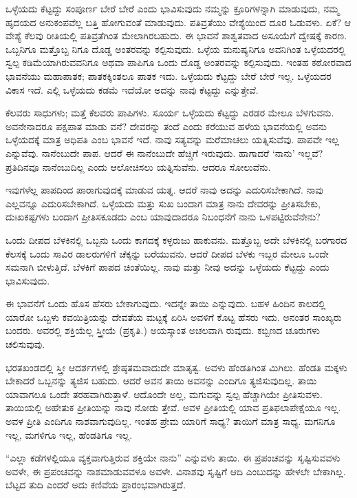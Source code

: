 ಒಳ್ಳೆಯದು ಕೆಟ್ಟದ್ದು ಸಂಪೂರ್ಣ ಬೇರೆ ಬೇರೆ ಎಂದು ಭಾವಿಸುವುದು ನಮ್ಮನ್ನು ಕ್ರೂರಿಗಳನ್ನಾಗಿ ಮಾಡುವುದು, ನಮ್ಮ ಹೃದಯದ ಅನುಕಂಪವೆಲ್ಲ ಬತ್ತಿ ಹೋಗುವಂತೆ ಮಾಡುವುದು. ಪತಿವ್ರತೆಯು ವೇಶ್ಯೆಯಿಂದ ದೂರ ಓಡುವಳು. ಏಕೆ? ಆ ವೇಶ್ಯೆ ಕೆಲವು ರೀತಿಯಲ್ಲಿ ಪತಿವ್ರತೆಗಿಂತ ಮೇಲಾಗಿರಬಹುದು. ಈ ಭಾವನೆ ಶಾಶ್ವತವಾದ ಅಸೂಯೆಗೆ ದ್ವೇಷಕ್ಕೆ ಕಾರಣ. ಒಬ್ಬನಿಗೂ ಮತ್ತೊಬ್ಬ ನಿಗೂ ದೊಡ್ಡ ಅಂತರವನ್ನು ಕಲ್ಪಿಸುವುದು. ಒಳ್ಳೆಯ ಮನುಷ್ಯನಿಗೂ ಅವನಿಗಿಂತ ಒಳ್ಳೆಯದರಲ್ಲಿ ಸ್ವಲ್ಪ ಕಡಿಮೆಯಾಗಿರುವವನಿಗೂ ಅಥವಾ ಪಾಪಿಗೂ ಒಂದು ದೊಡ್ಡ ಅಂತರವನ್ನು ಕಲ್ಪಿಸುವುದು. ಇಂತಹ ಕಠೋರವಾದ ಭಾವನೆಯು ಮಹಾಪಾತಕ; ಪಾತಕಕ್ಕಿಂತಲೂ ಪಾತಕ ಇದು. ಒಳ್ಳೆಯದು ಕೆಟ್ಟದ್ದು ಬೇರೆ ಬೇರೆ ಇಲ್ಲ. ಒಳ್ಳೆಯದರ ವಿಕಾಸ ಇದೆ. ಎಲ್ಲಿ ಒಳ್ಳೆಯದು ಕಡಮೆ ಇದೆಯೋ ಅದನ್ನು ನಾವು ಕೆಟ್ಟದ್ದು ಎನ್ನುತ್ತೇವೆ.

ಕೆಲವರು ಸಾಧುಗಳು; ಮತ್ತೆ ಕೆಲವರು ಪಾಪಿಗಳು. ಸೂರ್ಯ ಒಳ್ಳೆಯದು ಕೆಟ್ಟದ್ದು ಎರಡರ ಮೇಲೂ ಬೆಳಗುವನು. ಅವನೇನಾದರೂ ಪಕ್ಷಪಾತ ಮಾಡು ವನೆ? ದೇವರನ್ನು ತಂದೆ ಎಂದು ಕರೆಯುವ ಹಳೆಯ ಭಾವನೆಯಲ್ಲಿ ಅವನು ಒಳ್ಳೆಯದಕ್ಕೆ ಮಾತ್ರ ಅಧಿಪತಿ ಎಂಬ ಭಾವನೆ ಇದೆ. ನಾವು ಸತ್ಯವನ್ನು ಮರೆಮಾಚಲು ಯತ್ನಿಸುವೆವು. ಪಾಪವೇ ಇಲ್ಲ ಎನ್ನುವೆವು. ನಾನೆಂಬುದೇ ಪಾಪ. ಆದರೆ ಈ ನಾನೆಂಬುದೇ ಹೆಚ್ಚಿಗೆ ಇರುವುದು. ಹಾಗಾದರೆ ‘ನಾನು’ ಇಲ್ಲವೆ? ಪ್ರತಿದಿನವೂ ನಾನೆಂಬುದಿಲ್ಲ ಎಂದು ಆಲೋಚಿಸಲು ಯತ್ನಿಸುವೆನು. ಆದರೂ ಸೋಲುವೆನು.

ಇವುಗಳೆಲ್ಲ ಪಾಪದಿಂದ ಪಾರಾಗುವುದಕ್ಕೆ ಮಾಡುವ ಯತ್ನ. ಆದರೆ ನಾವು ಅದನ್ನು ಎದುರಿಸಬೇಕಾಗಿದೆ. ನಾವು ಎಲ್ಲವನ್ನೂ ಎದುರಿಸಬೇಕಾಗಿದೆ. ಒಳ್ಳೆಯದು ಮತ್ತು ಸುಖ ಬಂದಾಗ ಮಾತ್ರ ನಾನು ದೇವರನ್ನು ಪ್ರೀತಿಸಬೇಕು, ದುಃಖಕಷ್ಟಗಳು ಬಂದಾಗ ಪ್ರೀತಿಸಕೂಡದು ಎಂಬ ಯಾವುದಾದರೂ ನಿಬಂಧನೆಗೆ ನಾನು ಒಳಪಟ್ಟಿರುವೆನೇನು?

ಒಂದು ದೀಪದ ಬೆಳಕಿನಲ್ಲಿ ಒಬ್ಬನು ಒಂದು ಕಾಗದಕ್ಕೆ ಕಳ್ಳರುಜು ಹಾಕುವನು. ಮತ್ತೊಬ್ಬ ಅದೇ ಬೆಳಕಿನಲ್ಲಿ ಬರಗಾರದ ಕೆಲಸಕ್ಕೆ ಒಂದು ಸಾವಿರ ಡಾಲರುಗಳಿಗೆ ಚೆಕ್ಕನ್ನು ಬರೆಯುವನು. ಆದರೆ ದೀಪದ ಬೆಳಕು ಇಬ್ಬರ ಮೇಲೂ ಒಂದೇ ಸಮನಾಗಿ ಬೀಳುತ್ತಿದೆ. ಬೆಳಕಿಗೆ ಪಾಪದ ಚಿಂತೆಯಿಲ್ಲ. ನಾವು ಮತ್ತು ನೀವು ಅದನ್ನು ಒಳ್ಳೆಯದು ಕೆಟ್ಟದ್ದು ಎಂದು ಭಾವಿಸುವುದು.

ಈ ಭಾವನೆಗೆ ಒಂದು ಹೊಸ ಹೆಸರು ಬೇಕಾಗುವುದು. ಇದನ್ನೇ ತಾಯಿ ಎನ್ನುವುದು. ಬಹಳ ಹಿಂದಿನ ಕಾಲದಲ್ಲಿ ಯಾರೋ ಒಬ್ಬಳು ಕವಯಿತ್ರಿಯನ್ನು ದೇವತೆಯ ಮಟ್ಟಕ್ಕೆ ಏರಿಸಿ ಅವಳಿಗೆ ಕೊಟ್ಟ ಹೆಸರು ಇದು. ಅನಂತರ ಸಾಂಖ್ಯರು ಬಂದರು. ಅವರಲ್ಲಿ ಶಕ್ತಿಯೆಲ್ಲ ಸ್ತ್ರೀಯೆ (ಪ್ರಕೃತಿ.) ಅಯಸ್ಕಾಂತ ಅಚಲವಾಗಿ ರುವುದು. ಕಬ್ಬಿಣದ ಚೂರುಗಳು ಚಲಿಸುವುವು.

ಭರತಖಂಡದಲ್ಲಿ ಸ್ತ್ರೀ ಆದರ್ಶಗಳಲ್ಲಿ ಶ್ರೇಷ್ಠತಮವಾದುದೇ ಮಾತೃತ್ವ. ಅವಳು ಹೆಂಡತಿಗಿಂತ ಮಿಗಿಲು. ಹೆಂಡತಿ ಮಕ್ಕಳು ಬೇಕಾದರೆ ಒಬ್ಬನನ್ನು ತ್ಯಜಿಸ ಬಹುದು. ಆದರೆ ಅವನ ತಾಯಿ ಅವನನ್ನು ಎಂದಿಗೂ ತ್ಯಜಿಸುವುದಿಲ್ಲ. ತಾಯಿ ಯಾವಾಗಲೂ ಒಂದೇ ತರಹವಾಗಿರುತ್ತಾಳೆ. ಆದೊಂದೇ ಅಲ್ಲ, ಮಗುವನ್ನು ಸ್ವಲ್ಪ ಹೆಚ್ಚಾಗಿಯೇ ಪ್ರೀತಿಸುವಳು. ತಾಯಿಯಲ್ಲಿ ಅಹೇತುಕ ಪ್ರೀತಿಯನ್ನು ನಾವು ನೋಡು ತ್ತೇವೆ. ಅವಳ ಪ್ರೀತಿಯಲ್ಲಿ ಯಾವ ಪ್ರತಿಫಲಾಪೇಕ್ಷೆಯೂ ಇಲ್ಲ. ಅವಳ ಪ್ರೀತಿ ಎಂದಿಗೂ ನಾಶವಾಗುವುದಿಲ್ಲ. ಇಂತಹ ಪ್ರೇಮ ಯಾರಿಗೆ ಸಾಧ್ಯ? ತಾಯಿಗೆ ಮಾತ್ರ ಸಾಧ್ಯ. ಮಗನಿಗೂ ಇಲ್ಲ, ಮಗಳಿಗೂ ಇಲ್ಲ, ಹೆಂಡತಿಗೂ ಇಲ್ಲ.

“ಎಲ್ಲಾ ಕಡೆಗಳಲ್ಲಿಯೂ ವ್ಯಕ್ತವಾಗುತ್ತಿರುವ ಶಕ್ತಿಯೇ ನಾನು” ಎನ್ನುವಳು ತಾಯಿ. ಈ ಪ್ರಪಂಚವನ್ನು ಸೃಷ್ಟಿಸುವವಳು ಅವಳೇ, ಈ ಪ್ರಪಂಚವನ್ನು ನಾಶಮಾಡುವವಳೂ ಅವಳೇ. ವಿನಾಶವು ಸೃಷ್ಟಿಗೆ ಆದಿ ಎಂಬುದನ್ನು ಹೇಳಲೇ ಬೇಕಾಗಿಲ್ಲ. ಬೆಟ್ಟದ ತುದಿ ಎಂದರೆ ಅದು ಕಣಿವೆಯ ಪ್ರಾರಂಭವಾಗಿರುತ್ತದೆ.

